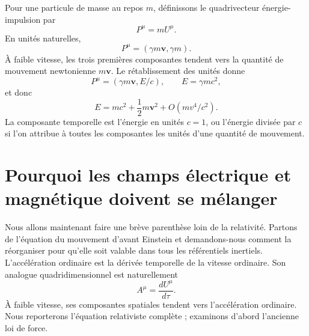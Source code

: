 \begin{classroomqa}\end{classroomqa}

Pour une particule de masse au repos \(m\), définissons le quadrivecteur énergie-impulsion par \begin{equation}
  P^\mu=mU^\mu.
\end{equation} En unités naturelles, \begin{equation}
  P^\mu=(\gamma m\boldsymbol v,\gamma m).
\end{equation} À faible vitesse, les trois premières composantes tendent vers la quantité de mouvement newtonienne \(m\boldsymbol v\). Le rétablissement des unités donne \begin{equation}
  P^\mu=(\gamma m\boldsymbol v,E/c),
  \qquad E=\gamma mc^2,
\end{equation} et donc \begin{equation}
  E=mc^2+\frac{1}{2}m\boldsymbol v^2+O(mv^4/c^2).
\end{equation} La composante temporelle est l’énergie en unités \(c=1\), ou l’énergie divisée par \(c\) si l’on attribue à toutes les composantes les unités d’une quantité de mouvement.

\begin{classroomqa}\end{classroomqa}

\section{Pourquoi les champs électrique et magnétique doivent se mélanger}

Nous allons maintenant faire une brève parenthèse loin de la relativité. Partons de l’équation du mouvement d’avant Einstein et demandons-nous comment la réorganiser pour qu’elle soit valable dans tous les référentiels inertiels. L’accélération ordinaire est la dérivée temporelle de la vitesse ordinaire. Son analogue quadridimensionnel est naturellement \begin{equation}
  A^\mu=\frac{dU^\mu}{d\tau}.
\end{equation} À faible vitesse, ses composantes spatiales tendent vers l’accélération ordinaire. Nous reporterons l’équation relativiste complète ; examinons d’abord l’ancienne loi de force.

